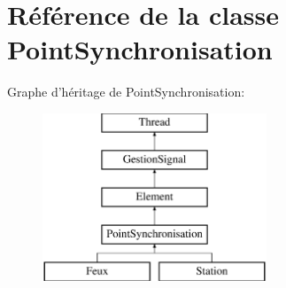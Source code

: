 \hypertarget{classPointSynchronisation}{
\section{Référence de la classe PointSynchronisation}
\label{classPointSynchronisation}
}
Graphe d'héritage de PointSynchronisation:\begin{figure}[H]
\begin{center}
\leavevmode
\includegraphics[height=5cm]{classPointSynchronisation}
\end{center}
\end{figure}
